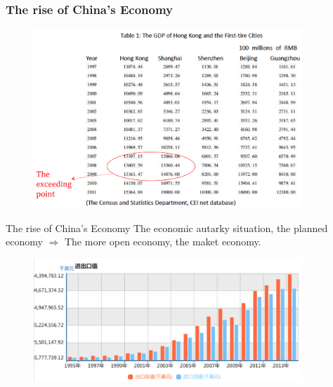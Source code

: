\documentclass[slidestop,uncompress,mathsans, 12pt]{beamer}
\begin{document}
\begin{frame}
\frametitle{The rise of China's Economy}

\begin{figure}[h!]
\centering
\includegraphics[width=0.9\textwidth]{hk8.png}
\label{threadsVsSync}
\end{figure}
\end{frame}

\begin{frame}{The rise of China's Economy}
The economic autarky situation, the planned economy
$\Longrightarrow$ The more open economy, the maket economy.\\
\begin{figure}[h!]
\centering
\includegraphics[width=0.9\textwidth]{hk24.png}
\label{threadsVsSync}
\end{figure}

\end{frame}
\end{document}

